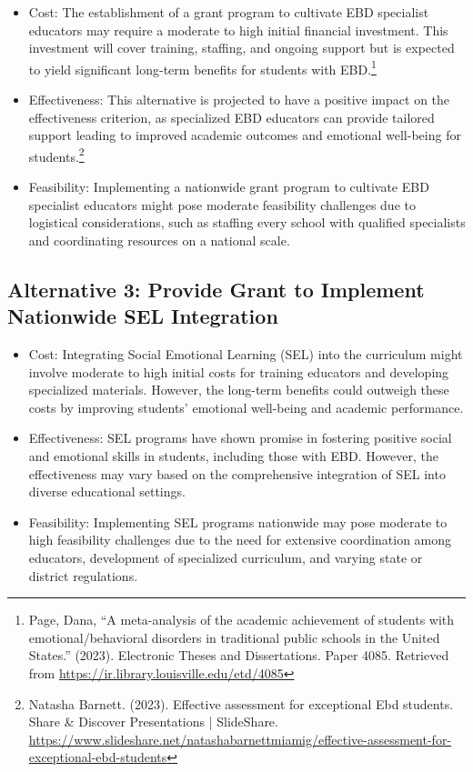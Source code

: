 \documentclass[11pt]{article}
\begin{document}
\begin{itemize}
\item Cost: The establishment of a grant program to cultivate EBD specialist educators may require a moderate to high initial financial investment. This investment will cover training, staffing, and ongoing support but is expected to yield significant long-term benefits for students with EBD.\footnote{Page, Dana, ``A meta-analysis of the academic achievement of students with emotional/behavioral disorders in traditional public schools in the United States.'' (2023). Electronic Theses and Dissertations. Paper 4085. Retrieved from \url{https://ir.library.louisville.edu/etd/4085}}
\item Effectiveness: This alternative is projected to have a positive impact on the effectiveness criterion, as specialized EBD educators can provide tailored support leading to improved academic outcomes and emotional well-being for students.\footnote{Natasha Barnett. (2023). Effective assessment for exceptional Ebd students. Share \& Discover Presentations | SlideShare. \url{https://www.slideshare.net/natashabarnettmiamig/effective-assessment-for-exceptional-ebd-students}}
\item Feasibility: Implementing a nationwide grant program to cultivate EBD specialist educators might pose moderate feasibility challenges due to logistical considerations, such as staffing every school with qualified specialists and coordinating resources on a national scale.
\end{itemize}

\subsection{Alternative 3: Provide Grant to Implement Nationwide SEL Integration}

\begin{itemize}
\item Cost: Integrating Social Emotional Learning (SEL) into the curriculum might involve moderate to high initial costs for training educators and developing specialized materials. However, the long-term benefits could outweigh these costs by improving students' emotional well-being and academic performance.
\item Effectiveness: SEL programs have shown promise in fostering positive social and emotional skills in students, including those with EBD. However, the effectiveness may vary based on the comprehensive integration of SEL into diverse educational settings.
\item Feasibility: Implementing SEL programs nationwide may pose moderate to high feasibility challenges due to the need for extensive coordination among educators, development of specialized curriculum, and varying state or district regulations.
\end{itemize}
\end{document}
